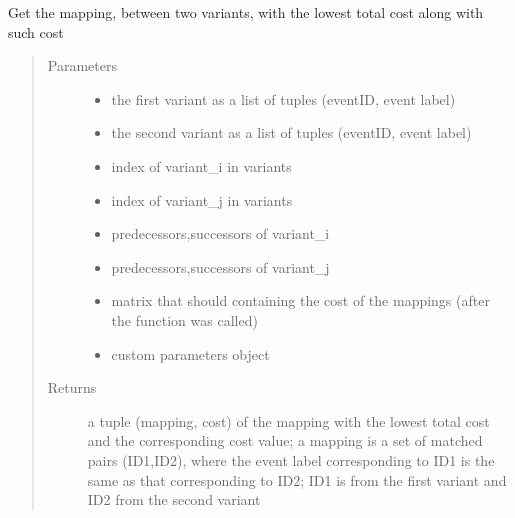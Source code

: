 \documentclass[letterpaper,10pt,english]{sphinxmanual}
\begin{document}
\begin{fulllineitems}
\label{\detokenize{cost function:costFunction.cost.optimalMapping}}
Get the mapping, between two variants, with the lowest total cost along with such cost
\begin{quote}\begin{description}
\item[{Parameters}] \leavevmode\begin{itemize}
\item {} 
 \textendash{} the first variant as a list of tuples (eventID, event label)

\item {} 
 \textendash{} the second variant as a list of tuples (eventID, event label)

\item {} 
 \textendash{} index of variant\_i in variants

\item {} 
 \textendash{} index of variant\_j in variants

\item {} 
 \textendash{} predecessors,successors of variant\_i

\item {} 
 \textendash{} predecessors,successors of variant\_j

\item {} 
 \textendash{} matrix that should containing the cost of the mappings (after the function was called)

\item {} 
 \textendash{} custom parameters object

\end{itemize}

\item[{Returns}] \leavevmode
a tuple (mapping, cost) of the mapping with the lowest total cost and the corresponding cost value; a mapping is a set of matched pairs (ID1,ID2), where the event label corresponding to ID1 is the same as that corresponding to ID2; ID1 is from the first variant and ID2 from the second variant

\end{description}\end{quote}

\end{fulllineitems}
\end{document}
